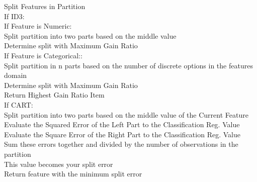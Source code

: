 \documentclass[twoside,11pt]{article}
\newcommand\tab[1][1cm]{\hspace*{#1}}
\begin{document}
Split Features in Partition\\
If ID3:\\
\tab If Feature is Numeric:\\
\tab \tab Split partition into two parts based on the middle value\\
\tab \tab Determine split with Maximum Gain Ratio\\
\tab If Feature is Categorical::\\
\tab \tab Split partition in n parts based on the number of discrete options in the features domain\\
\tab \tab Determine split with Maximum Gain Ratio\\ 
Return Highest Gain Ratio Item\\ 
\newline
If CART:\\
Split partition into two parts based on the middle value of the Current Feature\\
Evaluate the Squared Error of the Left Part to the Classification Reg. Value\\
Evaluate the Square Error of the Right Part to the Classification Reg. Value\\
Sum these errors together and divided by the number of observations in the partition\\
This value becomes your split error\\
Return feature with the minimum split error\\
\newline
\end{document}

